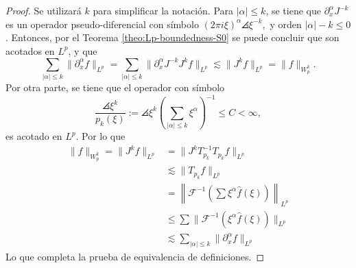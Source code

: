 \begin{proof}
	Se utilizará $k$ para simplificar la notación. Para $|\alpha|\leq k$, se tiene que $\partial^\alpha_xJ^{-k}$ es un operador pseudo-diferencial con símbolo $(2\pi i\xi)^\alpha\angles{\xi}^{-k},$ y orden $|\alpha|-k\leq0$. Entonces, por el Teorema \ref{theo:Lp-boundedness-S0} se puede concluir que son acotados en $L^p$, y que
	\begin{equation*}
		\sum_{|\alpha|\leq k} \|\partial^\alpha_xf\|_{L^p} = \sum_{|\alpha|\leq k} \|\partial^\alpha_xJ^{-k}J^kf\|_{L^p} \lesssim \|J^kf\|_{L^p} = \|f\|_{W^k_p}.
	\end{equation*}
	Por otra parte, se tiene que el operador con símbolo
	\begin{equation*}
		\frac{\angles{\xi}^k}{p_k(\xi)}:= \angles{\xi}^k \left(\sum_{|\alpha|\leq k} \xi^\alpha
		\right)^{-1} \leq C <\infty,
	\end{equation*}
	es acotado en $L^p$. Por lo que  
	\begin{align*}
		\|f\|_{W^k_p} =\|J^kf\|_{L^p} & = \|J^kT_{p_k}^{-1}T_{p_k} f\|_{L^p} \\
		& \lesssim \|T_{p_k} f\|_{L^p} \\ 
		& = \left\|\mathcal{F}^{-1}\left(\sum\xi^\alpha \widehat{f}(\xi)\right)\right\|_{L^p}  \\
		& \leq \sum \|\mathcal{F}^{-1}(\xi^\alpha\widehat{f}(\xi))\|_{L^p} \\
		& \lesssim \sum_{|\alpha|\leq k} \|\partial^\alpha_xf\|_{L^p}
	\end{align*}
	Lo que completa la prueba de equivalencia de definiciones.
\end{proof}




